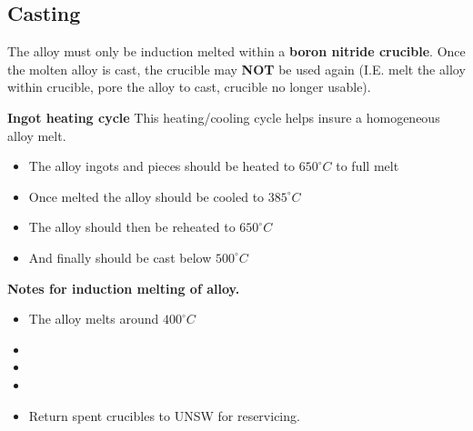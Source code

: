 \subsection{Casting}

The \MgZnCa alloy must only be induction melted within a \textbf{boron nitride crucible}. Once the molten alloy is cast, the crucible may \textbf{NOT} be used again (I.E. melt the alloy within crucible, pore the alloy to cast, crucible no longer usable). 

\textbf{Ingot heating cycle}
This heating/cooling cycle helps insure a homogeneous alloy melt.
\begin{itemize}
\item The \MgZnCa alloy ingots and pieces should be heated to $650^{\circ}C$ to full melt
\item Once melted the alloy should be cooled to $385^{\circ}C$
\item The alloy should then be reheated to $650^{\circ}C$
\item And finally should be cast below $500^{\circ}C$
\end{itemize}

\textbf{Notes for induction melting of \MgZnCa alloy.}
\begin{itemize}
\item The \MgZnCa alloy melts around $400^{\circ}C$
\item 
\item 
\item
\item Return spent crucibles to UNSW for reservicing. 
\end{itemize}